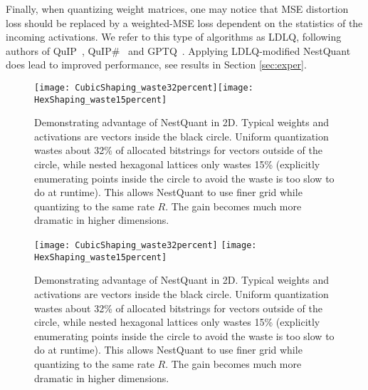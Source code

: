 Finally, when quantizing weight matrices, one may notice that MSE distortion loss should be replaced by a weighted-MSE loss dependent on the statistics of the incoming activations. We refer to this type of algorithms as LDLQ, following authors of QuIP~\citep{chee2024}, QuIP\#~\citep{tseng2024} and GPTQ~\citep{frantar2023_2}. Applying LDLQ-modified NestQuant does lead to improved performance, see results in Section \ref{sec:exper}.

\ifisicml
\begin{figure}[t]
\hbox{\texttt{[image: CubicShaping\_waste32percent]}\hfil\texttt{[image: HexShaping\_waste15percent]}}
    \caption{Demonstrating advantage of NestQuant in 2D. Typical weights and activations are vectors inside the black circle. Uniform quantization wastes about 32\% of allocated bitstrings for vectors outside of the circle, while nested hexagonal lattices only wastes 15\% (explicitly enumerating points inside the circle to avoid the waste is too slow to do at runtime). This allows NestQuant to use finer grid while quantizing to the same rate $R$. The gain becomes much more dramatic in higher dimensions.}\label{fig:shaping}
\end{figure}

\else
\begin{figure}[t]
    \centering
    \texttt{[image: CubicShaping\_waste32percent]}%
    \texttt{[image: HexShaping\_waste15percent]}
    \caption{Demonstrating advantage of NestQuant in 2D. Typical weights and activations are vectors inside the black circle. Uniform quantization wastes about 32\% of allocated bitstrings for vectors outside of the circle, while nested hexagonal lattices only wastes 15\% (explicitly enumerating points inside the circle to avoid the waste is too slow to do at runtime). This allows NestQuant to use finer grid while quantizing to the same rate $R$. The gain becomes much more dramatic in higher dimensions.}\label{fig:shaping}
\end{figure}

\fi